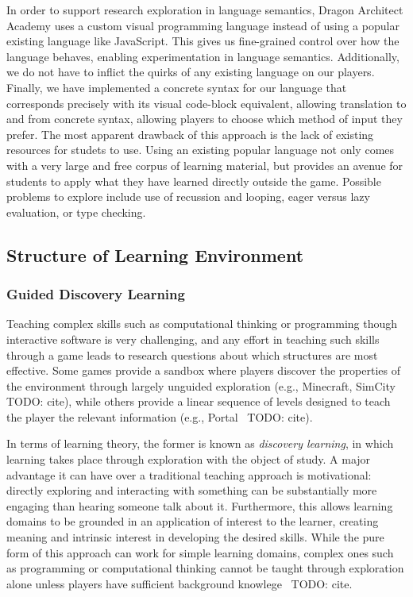 \documentclass{sig-alternate}
\newcommand{\TODO}[1]{{\color{red} TODO: #1}}
\newcommand{\gametitle}{{\color{RoyalPurple} Dragon Architect Academy}}
\begin{document}
In order to support research exploration in language semantics, \gametitle{} uses a custom visual programming language instead of using a popular existing language like JavaScript. 
This gives us fine-grained control over how the language behaves, enabling experimentation in language semantics.
Additionally, we do not have to inflict the quirks of any existing language on our players. 
Finally, we have implemented a concrete syntax for our language that corresponds precisely with its visual code-block equivalent, allowing translation to and from concrete syntax, allowing players to choose which method of input they prefer.  
The most apparent drawback of this approach is the lack of existing resources for studets to use.
Using an existing popular language not only comes with a very large and free corpus of learning material, but provides an avenue for students to apply what they have learned directly outside the game.
Possible problems to explore include use of recussion and looping, eager versus lazy evaluation, or type checking.

\subsection{Structure of Learning Environment}

\subsubsection{Guided Discovery Learning}

Teaching complex skills such as computational thinking or programming though interactive software is very challenging, and any effort in teaching such skills through a game leads to research questions about which structures are most effective.
Some games provide a sandbox where players discover the properties of the environment through largely unguided exploration (e.g., Minecraft, SimCity~\TODO{cite}), while others provide a linear sequence of levels designed to teach the player the relevant information (e.g., Portal~\TODO{cite}). 

In terms of learning theory, the former is known as \emph{discovery learning}, in which learning takes place through exploration with the object of study.
A major advantage it can have over a traditional teaching approach is motivational: directly exploring and interacting with something can be substantially more engaging than hearing someone talk about it.
Furthermore, this allows learning domains to be grounded in an application of interest to the learner, creating meaning and intrinsic interest in developing the desired skills.
While the pure form of this approach can work for simple learning domains, complex ones such as programming or computational thinking cannot be taught through exploration alone unless players have sufficient background knowlege~\TODO{cite}.
\end{document}
